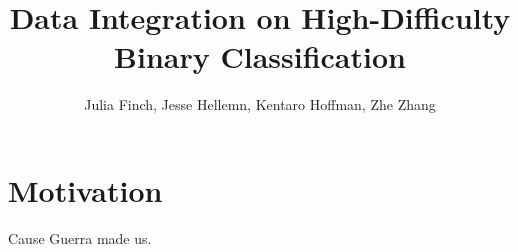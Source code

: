 \documentclass{article}
\begin{document}
\title{Data Integration on High-Difficulty Binary Classification}
\author{Julia Finch, Jesse Hellemn, Kentaro Hoffman, Zhe Zhang}
\maketitle


\section{Motivation}
Cause Guerra made us.
\end{document}
